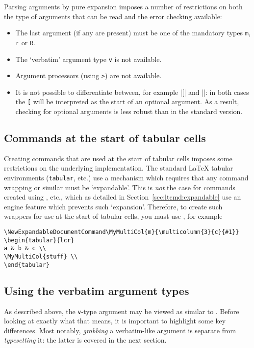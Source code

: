 \documentclass{ltxguide}
\begin{document}
Parsing arguments by pure expansion imposes a number of restrictions on
both the type of arguments that can be read and the error checking
available:
\begin{itemize}
  \item The last argument (if any are present) must be one of the
    mandatory types \texttt{m}, \texttt{r} or \texttt{R}.
  \item The `verbatim' argument type \texttt{v} is not available.
  \item Argument processors (using \texttt{>}) are not available.
  \item It is not possible to differentiate between, for example
    |\foo[| and |\foo{[}|: in both cases the \texttt{[} will be
    interpreted as the start of an optional argument. As a
    result, checking for optional arguments is less robust than
    in the standard version.
\end{itemize}

\subsection{Commands at the start of tabular cells}

Creating commands that are used at the start of tabular cells imposes
some restrictions on the underlying implementation. The standard \LaTeX{}
tabular environments (\texttt{tabular}, etc.)  use a mechanism which requires
that any command wrapping  or similar must be
`expandable'. This is \emph{not} the case for commands created using
, etc., which as detailed in
Section~\ref{sec:ltcmd:expandable} use an engine feature which prevents
such `expansion'. Therefore, to create such wrappers for use at the start
of tabular cells, you must use , for example
\begin{verbatim}
\NewExpandableDocumentCommand\MyMultiCol{m}{\multicolumn{3}{c}{#1}}
\begin{tabular}{lcr}
a & b & c \\
\MyMultiCol{stuff} \\
\end{tabular}
\end{verbatim}

\subsection{Using the verbatim argument types}

As described above, the \texttt{v}-type argument may be viewed as similar to
. Before looking at exactly what that means, it is important to
highlight some key differences. Most notably, \emph{grabbing} a verbatim-like
argument is separate from \emph{typesetting} it: the latter is covered in the
next section.
\end{document}
